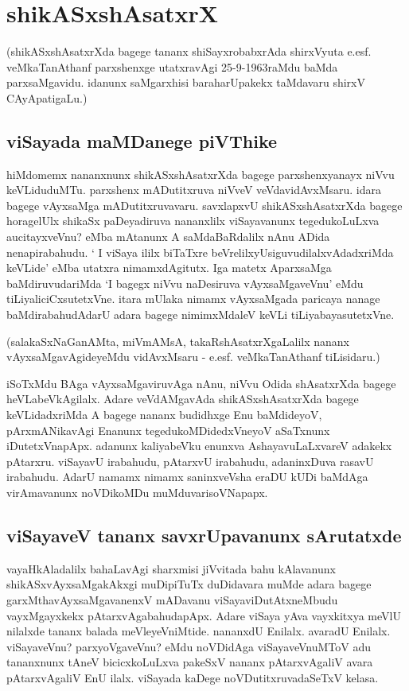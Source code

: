 \chapter{shikASxshAsatxrX}

(shikASxshAsatxrXda bagege tananx shiSayxrobabxrAda shirxVyuta e.esf. veMkaTanAthanf parxshenxge utatxravAgi  25-9-1963raMdu baMda parxsaMgavidu. idanunx  saMgarxhisi baraharUpakekx  taMdavaru shirxV CAyApatigaLu.)

\section*{viSayada maMDanege piVThike}

hiMdomemx  nananxnunx  shikASxshAsatxrXda bagege parxshenxyanayx niVvu keVLiduduMTu. parxshenx mADutitxruva niVveV veVdavidAvxMsaru. idara bagege vAyxsaMga mADutitxruvavaru. savxlapxvU shikASxshAsatxrXda bagege horagelUlx   shikaSx paDeyadiruva nananxlilx  viSayavanunx  tegedukoLuLxva aucitayxveVnu? eMba mAtanunx  A saMdaBaRdalilx  nAnu ADida nenapirabahudu. ` I viSaya ililx biTaTxre beVrelilxyUsiguvudilalxvAdadxriMda keVLide'  eMba utatxra nimamxdAgitutx. Iga matetx AparxsaMga baMdiruvudariMda   `I bagegx niVvu naDesiruva vAyxsaMgaveVnu' eMdu tiLiyaliciCxsutetxVne.  itara mUlaka nimamx vAyxsaMgada paricaya nanage baMdirabahudAdarU adara bagege nimimxMdaleV keVLi tiLiyabayasutetxVne. 

(salakaSxNaGanAMta, miVmAMsA, takaRshAsatxrXgaLalilx nananx vAyxsaMgavAgideyeMdu vidAvxMsaru - e.esf. veMkaTanAthanf tiLisidaru.)

iSoTxMdu BAga vAyxsaMgaviruvAga nAnu, niVvu Odida shAsatxrXda bagege heVLabeVkAgilalx. Adare veVdAMgavAda shikASxshAsatxrXda bagege keVLidadxriMda A bagege nananx budidhxge Enu baMdideyoV, pArxmANikavAgi Enanunx  tegedukoMDidedxVneyoV aSaTxnunx iDutetxVnapApx. adanunx kaliyabeVku enunxva AshayavuLaLxvareV adakekx pAtarxru. viSayavU irabahudu, pAtarxvU  irabahudu, adaninxDuva rasavU irabahudu. AdarU namamx nimamx saninxveVsha eraDU kUDi baMdAga virAmavanunx noVDikoMDu muMduvarisoVNapapx.

\section*{viSayaveV tananx savxrUpavanunx  sArutatxde}

vayaHkAladalilx  bahaLavAgi sharxmisi jiVvitada bahu kAlavanunx  shikASxvAyxsaMgakAkxgi muDipiTuTx  duDidavara muMde adara bagege garxMthavAyxsaMgavanenxV mADavanu viSayaviDutAtxneMbudu vayxMgayxkekx  pAtarxvAgabahudapApx. Adare viSaya yAva vayxkitxya meVlU nilalxde tananx balada meVleyeVniMtide. nananxdU Enilalx. avaradU Enilalx. viSayaveVnu? parxyoVgaveVnu? eMdu noVDidAga viSayaveVnuMToV adu tananxnunx tAneV bicicxkoLuLxva pakeSxV nananx pAtarxvAgaliV avara pAtarxvAgaliV EnU ilalx. viSayada kaDege noVDutitxruvadaSeTxV kelasa.

